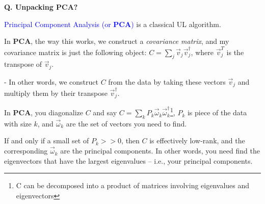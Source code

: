 \begin{frame}[fragile]{\textbf{Q. Unpacking PCA?}}
  \begin{wideitemize}
    \item \textcolor{blue}{Principal Component Analysis (or \textbf{PCA})} is a classical UL algorithm.
    \item In \textbf{PCA}, the way this works, we construct a \textit{covariance matrix},
    and my covariance matrix is just the following object: $C = \sum_{j} \vec{v}_j\vec{v}^{\dagger}_{j}$,
    where $\vec{v}^{T}_{j}$ is the transpose of $\vec{v}_{j}$.
    \begin{wideitemize}
      \item[-] In other words, we construct $C$ from the data by taking these vectors $\vec{v}_j$ and
      multiply them by their transpose $\vec{v}^{\dagger}_j$.
    \end{wideitemize}
    \item In \textbf{PCA}, you diagonalize $C$ and say $C = \sum_{k} P_k
	  \vec{\omega}_{k}\vec{\omega}^{\dagger}_{k}$\footnote{C can be decomposed into a product
    of matrices involving eigenvalues and eigenvectors}, $P_k$ is piece of the data with size $k$,
    and $\vec{\omega}_{k}$ are the set of vectors you need to find.
    \item If and only if a small set of $P_k >> 0$, then $C$ is effectively low-rank,
    and the corresponding $\vec{\omega}_{k}$ are the principal components. In other words,
    you need find the eigenvectors that have the largest eigenvalues -- i.e., your principal components.
  \end{wideitemize}

\end{frame}


